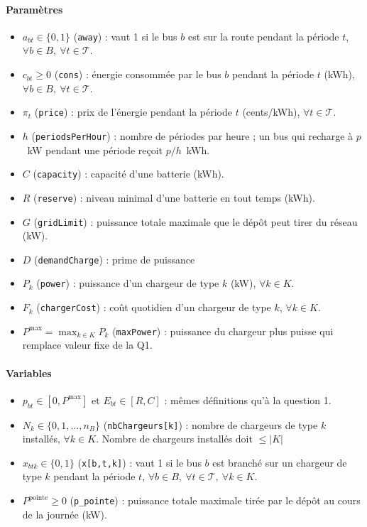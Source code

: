 \documentclass{article}
\begin{document}
\paragraph{Paramètres}
\begin{itemize}
  \item $a_{bt} \in \{0,1\}$ (\texttt{away}) : vaut 1 si le bus $b$ est sur la route pendant la période $t$, $\forall b \in B,\ \forall t \in \mathcal{T}$.
  \item $c_{bt} \geq 0$ (\texttt{cons}) : énergie consommée par le bus $b$ pendant la période $t$ (kWh), $\forall b \in B,\ \forall t \in \mathcal{T}$.
  \item $\pi_t$ (\texttt{price}) : prix de l'énergie pendant la période $t$ (cents/kWh), $\forall t \in \mathcal{T}$.
  \item $h$ (\texttt{periodsPerHour}) : nombre de périodes par heure ; un bus qui recharge à $p$~kW pendant une période reçoit $p/h$~kWh.
  \item $C$ (\texttt{capacity}) : capacité d'une batterie (kWh).
  \item $R$ (\texttt{reserve}) : niveau minimal d'une batterie en tout temps (kWh).
  \item $G$ (\texttt{gridLimit}) : puissance totale maximale que le dépôt peut tirer du réseau (kW).
  \item $D$ (\texttt{demandCharge}) : prime de puissance
  \item $P_k$ (\texttt{power}) : puissance d'un chargeur de type $k$ (kW), $\forall k \in K$.
  \item $F_k$ (\texttt{chargerCost}) : coût quotidien d'un chargeur de type $k$, $\forall k \in K$.
  \item $P^{\max} = \max_{k \in K} P_k$ (\texttt{maxPower}) : puissance du chargeur plus puisse qui remplace valeur fixe de la Q1. 
\end{itemize}

\paragraph{Variables}
\begin{itemize}
  \item $p_{bt} \in [0, P^{\max}]$ et $E_{bt} \in [R, C]$ : mêmes définitions qu'à la question 1.
  \item $N_k \in \{0, 1, \dots, n_B\}$ (\texttt{nbChargeurs[k]}) : nombre de chargeurs de type $k$ installés, $\forall k \in K$. Nombre de chargeurs installés doit $\leq |K| $ 
  \item $x_{btk} \in \{0,1\}$ (\texttt{x[b,t,k]}) : vaut 1 si le bus $b$ est branché sur un chargeur de type $k$ pendant la période $t$, $\forall b \in B,\ \forall t \in \mathcal{T},\ \forall k \in K$.
  \item $P^{\text{pointe}} \geq 0$ (\texttt{p\_pointe}) : puissance totale maximale tirée par le dépôt au cours de la journée (kW).
\end{itemize}
\end{document}
